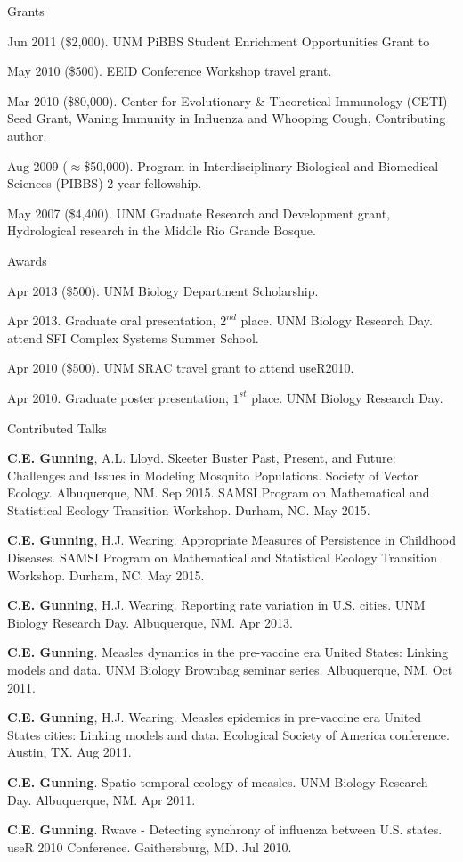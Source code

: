 \documentclass{resume} %
\begin{document}
\begin{rSection}{Grants}
\item Jun 2011 (\$2,000). UNM PiBBS Student Enrichment Opportunities Grant to
\item May 2010 (\$500). EEID Conference Workshop travel grant.
\item Mar 2010 (\$80,000). Center for Evolutionary \& Theoretical Immunology (CETI) Seed
Grant, Waning Immunity in Influenza and Whooping Cough,
Contributing author.
\item Aug 2009 ($\approx$\$50,000). Program in Interdisciplinary Biological and Biomedical
Sciences (PIBBS) 2 year fellowship.
\item May 2007 (\$4,400). UNM Graduate Research and Development grant, Hydrological
research in the Middle Rio Grande Bosque. 
\end{rSection}

\begin{rSection}{Awards}
\item Apr 2013 (\$500). UNM Biology Department Scholarship.
\item Apr 2013. Graduate oral presentation, $2^{nd}$ place. UNM Biology Research Day.
attend SFI Complex Systems Summer School.
\item Apr 2010 (\$500). UNM SRAC travel grant to attend useR2010.
\item Apr 2010.  Graduate poster presentation, $1^{st}$ place. UNM Biology Research Day.
\end{rSection}

\begin{rSection}{Contributed Talks}
\item {\bf C.E. Gunning}, A.L. Lloyd.  Skeeter Buster Past, Present, and Future: Challenges and Issues in Modeling Mosquito Populations.
Society of Vector Ecology. Albuquerque, NM. Sep 2015.
SAMSI Program on Mathematical and Statistical Ecology Transition Workshop. Durham, NC. May 2015.
\item {\bf C.E. Gunning}, H.J. Wearing.  Appropriate Measures of Persistence in Childhood Diseases.
SAMSI Program on Mathematical and Statistical Ecology Transition Workshop. Durham, NC. May 2015.
\item {\bf C.E. Gunning}, H.J. Wearing.  Reporting rate variation in U.S. cities.
UNM Biology Research Day. Albuquerque, NM. Apr 2013.
\item {\bf C.E. Gunning}.  Measles dynamics in the pre-vaccine era United States: Linking
models and data. UNM Biology Brownbag seminar series. Albuquerque, NM. Oct 2011.
\item {\bf C.E. Gunning}, H.J. Wearing.  Measles epidemics in pre-vaccine era United States cities: Linking models and data. Ecological Society of America conference. Austin, TX. Aug 2011.
\item {\bf C.E. Gunning}.  Spatio-temporal ecology of measles. 
UNM Biology Research Day. Albuquerque, NM. Apr 2011.
\item {\bf C.E. Gunning}. Rwave - Detecting synchrony of influenza between U.S. states.
useR 2010 Conference. Gaithersburg, MD. Jul 2010.
\end{rSection}
\end{document}
